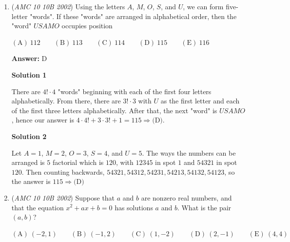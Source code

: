 \begin{enumerate}
 Then, the rest of the steps in Solution 1 can be followed.

 For example, if the first of the bottom three cells is a Monday, it is clear that the following two days are Tuesday and Wednesday. This means that the new bottom three cells (as both months have 31 days) of August will be Thursday, Friday, and Saturday. This same process can be repeated so that the second cell is represented as Monday and so forth; then, the only day of the week that appears when all three cases are considered is $\boxed{\textrm{(D)}\ \text{Thursday}}$.

 


	\item (\textit{AMC 10 10B 2002}) Using the letters $A$, $M$, $O$, $S$, and $U$, we can form five-letter "words". If these "words" are arranged in alphabetical order, then the "word" $USAMO$ occupies position


 $\mathrm{(A) \ } 112\qquad \mathrm{(B) \ } 113\qquad \mathrm{(C) \ } 114\qquad \mathrm{(D) \ } 115\qquad \mathrm{(E) \ } 116$

 \textbf{Answer: }D



\textbf{Solution 1}

There are $4!\cdot 4$ "words" beginning with each of the first four letters alphabetically. From there, there are $3!\cdot 3$ with $U$ as the first letter and each of the first three letters alphabetically. After that, the next "word" is $USAMO$, hence our answer is $4\cdot 4!+3\cdot 3!+1=\boxed{115\Rightarrow\text{(D)}}$.

 



\textbf{Solution 2}

Let $A = 1$, $M = 2$, $O = 3$, $S = 4$, and $U = 5$. The ways the numbers can be arranged is $5$ factorial which is $120$, with $12345$ in spot $1$ and $54321$ in spot $120$. Then counting backwards, $54321, 54312, 54231, 54213, 54132, 54123$, so the answer is $\boxed{115\Rightarrow\text{(D)}}$



	\item (\textit{AMC 10 10B 2002}) Suppose that $a$ and $b$ are nonzero real numbers, and that the equation $x^2+ax+b=0$ has solutions $a$ and $b$. What is the pair $(a,b)$?


 $\mathrm{(A) \ } (-2,1)\qquad \mathrm{(B) \ } (-1,2)\qquad \mathrm{(C) \ } (1,-2)\qquad \mathrm{(D) \ } (2,-1)\qquad \mathrm{(E) \ } (4,4)$


\end{enumerate}
